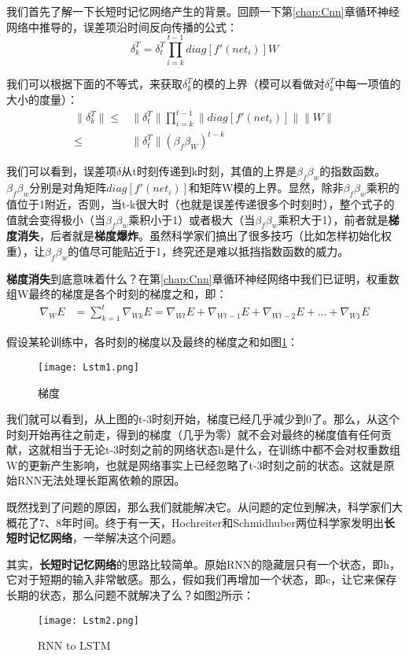 我们首先了解一下长短时记忆网络产生的背景。回顾一下第\ref{chap:Cnn}章循环神经网络中推导的，误差项沿时间反向传播的公式：
\[
	\delta_k^T=\delta_t^T\prod_{i=k}^{t-1}diag[f'({net}_{i})]W
\]

我们可以根据下面的不等式，来获取\(\delta_k^T\)的模的上界（模可以看做对\(\delta_k^T\)中每一项值的大小的度量）：
\begin{align*}
	\|\delta_k^T\|\leqslant & \|\delta_t^T\|\prod_{i=k}^{t-1}\|diag[f'({net}_{i})]\|\|W\| \\
	\leqslant               & \|\delta_t^T\|(\beta_f\beta_W)^{t-k}
\end{align*}

我们可以看到，误差项\(\delta\)从t时刻传递到k时刻，其值的上界是\(\beta_f\beta_w\)的指数函数。\(\beta_f\beta_w\)分别是对角矩阵\(diag[f'({net}_{i})]\)和矩阵W模的上界。显然，除非\(\beta_f\beta_w\)乘积的值位于1附近，否则，当t-k很大时（也就是误差传递很多个时刻时），整个式子的值就会变得极小（当\(\beta_f\beta_w\)乘积小于1）或者极大（当\(\beta_f\beta_w\)乘积大于1），前者就是\textbf{梯度消失}，后者就是\textbf{梯度爆炸}。虽然科学家们搞出了很多技巧（比如怎样初始化权重），让\(\beta_f\beta_w\)的值尽可能贴近于1，终究还是难以抵挡指数函数的威力。

\textbf{梯度消失}到底意味着什么？在第\ref{chap:Cnn}章循环神经网络中我们已证明，权重数组W最终的梯度是各个时刻的梯度之和，即：
\begin{align*}
	\nabla_WE & =\sum_{k=1}^t\nabla_{Wk}E=\nabla_{Wt}E+\nabla_{Wt-1}E+\nabla_{Wt-2}E+...+\nabla_{W1}E
\end{align*}

假设某轮训练中，各时刻的梯度以及最终的梯度之和如图\ref{fig:Lstm1}：
\begin{figure}[!h]
	\centering
	\texttt{[image: Lstm1.png]}
	\caption{梯度}
	\label{fig:Lstm1}
\end{figure}
我们就可以看到，从上图的t-3时刻开始，梯度已经几乎减少到0了。那么，从这个时刻开始再往之前走，得到的梯度（几乎为零）就不会对最终的梯度值有任何贡献，这就相当于无论t-3时刻之前的网络状态h是什么，在训练中都不会对权重数组W的更新产生影响，也就是网络事实上已经忽略了t-3时刻之前的状态。这就是原始RNN无法处理长距离依赖的原因。

既然找到了问题的原因，那么我们就能解决它。从问题的定位到解决，科学家们大概花了7、8年时间。终于有一天，Hochreiter和Schmidhuber两位科学家发明出\textbf{长短时记忆网络}，一举解决这个问题。

其实，\textbf{长短时记忆网络}的思路比较简单。原始RNN的隐藏层只有一个状态，即h，它对于短期的输入非常敏感。那么，假如我们再增加一个状态，即c，让它来保存长期的状态，那么问题不就解决了么？如图\ref{fig:Lstm2}所示：
\begin{figure}[!h]
	\centering
	\texttt{[image: Lstm2.png]}
	\caption{RNN to LSTM}
	\label{fig:Lstm2}
\end{figure}

